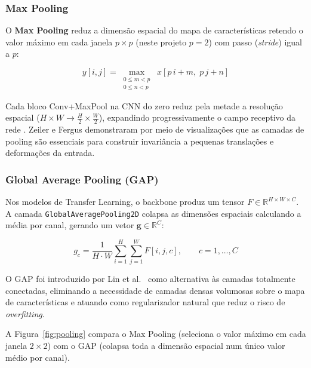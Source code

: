 \documentclass[12pt,a4paper]{article}
\begin{document}
\subsubsection{Max Pooling}

O \textbf{Max Pooling} reduz a dimensão espacial do mapa de características
retendo o valor máximo em cada janela $p\times p$ (neste projeto $p=2$) com
passo (\emph{stride}) igual a $p$:

\begin{equation}
  y[i,j] = \max_{\substack{0\le m<p\\0\le n<p}}\; x[p\,i+m,\;p\,j+n]
  \label{eq:maxpool}
\end{equation}

Cada bloco Conv+MaxPool na CNN do zero reduz pela metade a resolução espacial
($H\times W\to\tfrac{H}{2}\times\tfrac{W}{2}$), expandindo progressivamente
o campo receptivo da rede \cite{lecun1998gradient}. Zeiler e Fergus
\cite{zeiler2014visualizing} demonstraram por meio de visualizações que as
camadas de pooling são essenciais para construir invariância a pequenas
translações e deformações da entrada.

\subsubsection{Global Average Pooling (GAP)}

Nos modelos de Transfer Learning, o backbone produz um tensor
$F\in\mathbb{R}^{H\times W\times C}$. A camada \texttt{GlobalAveragePooling2D}
colapsa as dimensões espaciais calculando a média por canal, gerando um
vetor $\mathbf{g}\in\mathbb{R}^{C}$:

\begin{equation}
  g_c = \frac{1}{H\cdot W}\sum_{i=1}^{H}\sum_{j=1}^{W} F[i,j,c],
  \qquad c = 1,\ldots,C
  \label{eq:gap}
\end{equation}

O GAP foi introduzido por Lin et al.\ \cite{lin2013network} como alternativa
às camadas totalmente conectadas, eliminando a necessidade de camadas densas
volumosas sobre o mapa de características e atuando como regularizador
natural que reduz o risco de \emph{overfitting}.

A Figura~\ref{fig:pooling} compara o Max Pooling (seleciona o valor máximo
em cada janela $2\times2$) com o GAP (colapsa toda a dimensão espacial
num único valor médio por canal).
\end{document}
